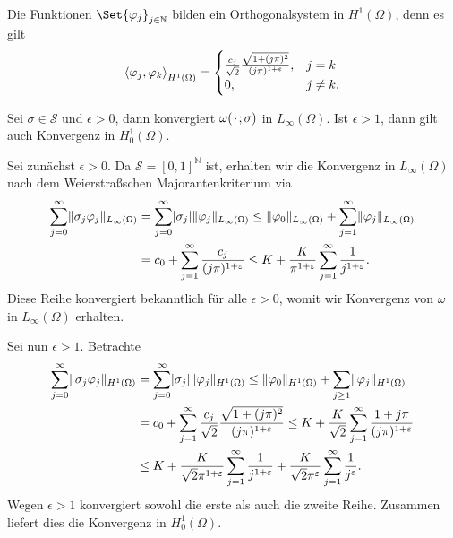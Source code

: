 \begin{Lemma}
    Die Funktionen $\Set{ \varphi_{j} }_{j \in \mathbb{N}}$ bilden ein Orthogonalsystem in $H^{1}(\Omega)$, denn es gilt
    \begin{equation}
        \left\langle\varphi_{j},\varphi_{k}\right\rangle_{H^{1}(\Omega)} = \begin{cases}
            \frac{c_{j}}{\sqrt 2 } \frac{\sqrt{1 + (j \pi)^{2}}}{(j \pi)^{1 + \varepsilon}},   &j = k \\
            0,          &j \neq k.
        \end{cases}
    \end{equation}
\end{Lemma}

\begin{Lemma}
    Sei $\sigma \in \mathcal S$ und $\epsilon > 0$, dann konvergiert $\omega({\mkern2mu\cdot\mkern2mu}; \sigma)$ in $L_{\infty}(\Omega)$.
    Ist $\epsilon > 1$, dann gilt auch Konvergenz in $H^{1}_{0}(\Omega)$.

    \begin{Beweis}
        Sei zunächst $\epsilon > 0$.
        Da $\mathcal S = [0, 1]^{\mathbb{N}}$ ist, erhalten wir die Konvergenz in $L_{\infty}(\Omega)$ nach dem Weierstraßschen Majorantenkriterium via
        \begin{align}
            \sum_{j = 0}^{\infty} \lVert\sigma_{j} \varphi_{j}\rVert_{L_{\infty}(\Omega)}
            &= \sum_{j = 0}^{\infty} \lvert\sigma_{j}\rvert \lVert\varphi_{j}\rVert_{L_{\infty}(\Omega)}
             \leq \lVert\varphi_{0}\rVert_{L_{\infty}(\Omega)} + \sum_{j = 1}^{\infty}  \lVert\varphi_{j}\rVert_{L_{\infty}(\Omega)}
            \\&= c_{0} + \sum_{j = 1}^{\infty}  \frac{c_{j}}{(j \pi)^{1+\varepsilon}}
               \leq K + \frac{K}{\pi^{1+\varepsilon}} \sum_{j = 1}^{\infty} \frac{1}{j^{1+\varepsilon}}.
        \end{align}
        Diese Reihe konvergiert bekanntlich für alle $\epsilon > 0$, womit wir Konvergenz von $\omega$ in $L_{\infty}(\Omega)$ erhalten.

        Sei nun $\epsilon > 1$.
        Betrachte
        \begin{align}
            \sum_{j = 0}^{\infty} \lVert\sigma_{j} \varphi_{j}\rVert_{H^{1}(\Omega)}
            &= \sum_{j = 0}^{\infty} \lvert\sigma_{j}\rvert \lVert\varphi_{j}\rVert_{H^{1}(\Omega)}
            \leq  \lVert\varphi_{0}\rVert_{H^{1}(\Omega)} + \sum_{j \geq 1} \lVert\varphi_{j}\rVert_{H^{1}(\Omega)}
            \\&= c_{0} + \sum_{j = 1}^{\infty} \frac{c_{j}}{\sqrt 2}\frac{\sqrt{1 + (j \pi)^{2}}}{(j \pi)^{1+\varepsilon}}
            \leq K + \frac{K}{\sqrt{2}} \sum_{j = 1}^{\infty} \frac{1 + j \pi}{(j \pi)^{1+\varepsilon}}
            \\&\leq K + \frac{K}{\sqrt{2} \pi^{1 + \varepsilon}} \sum_{j = 1}^{\infty} \frac{1}{j^{1+\varepsilon}} + \frac{K}{\sqrt{2} \pi^{\varepsilon}} \sum_{j = 1}^{\infty} \frac{1}{j^{\varepsilon}}.
        \end{align}
        Wegen $\epsilon > 1$ konvergiert sowohl die erste als auch die zweite Reihe.
        Zusammen liefert dies die Konvergenz in $H^{1}_{0}(\Omega)$.
    \end{Beweis}
\end{Lemma}

